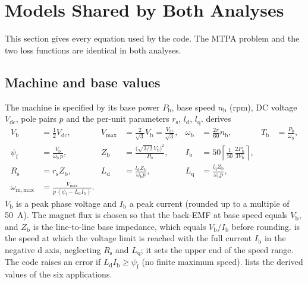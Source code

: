 \section{Models Shared by Both Analyses}\label{sec:models}
This section gives every equation used by the code. The MTPA problem and the two loss functions are identical in both analyses.

\subsection{Machine and base values}\label{sec:design}
The machine is specified by its base power $P_\mathrm{b}$, base speed $n_\mathrm{b}$ (rpm), DC voltage $V_\mathrm{dc}$, pole pairs $p$ and the per-unit parameters $r_\mathrm{s}$, $l_\mathrm{d}$, $l_\mathrm{q}$.  derives
\begin{align}
V_\mathrm{b}&=\tfrac12 V_\mathrm{dc}, & V_\mathrm{max}&=\tfrac{2}{\sqrt3}V_\mathrm{b}=\tfrac{V_\mathrm{dc}}{\sqrt3}, & \omega_\mathrm{b}&=\tfrac{2\pi}{60}n_\mathrm{b}, & T_\mathrm{b}&=\tfrac{P_\mathrm{b}}{\omega_\mathrm{b}}, \label{eq:base1}\\
\psi_\mathrm{f}&=\frac{V_\mathrm{b}}{\omega_\mathrm{b}\,p}, & Z_\mathrm{b}&=\frac{\big(\sqrt{3/2}\,V_\mathrm{b}\big)^2}{P_\mathrm{b}}, & I_\mathrm{b}&=50\left\lceil\frac{1}{50}\,\frac{2P_\mathrm{b}}{3V_\mathrm{b}}\right\rceil, \label{eq:base2}\\
R_\mathrm{s}&=r_\mathrm{s}Z_\mathrm{b}, & L_\mathrm{d}&=\frac{l_\mathrm{d}Z_\mathrm{b}}{\omega_\mathrm{b}p}, & L_\mathrm{q}&=\frac{l_\mathrm{q}Z_\mathrm{b}}{\omega_\mathrm{b}p}, \label{eq:base3}\\
\omega_\mathrm{m,max}&=\frac{V_\mathrm{max}}{p\,(\psi_\mathrm{f}-L_\mathrm{d}I_\mathrm{b})}. \label{eq:wmax}
\end{align}
$V_\mathrm{b}$ is a peak phase voltage and $I_\mathrm{b}$ a peak current (rounded up to a multiple of \SI{50}{\ampere}). The magnet flux is chosen so that the back-EMF at base speed equals $V_\mathrm{b}$, and $Z_\mathrm{b}$ is the line-to-line base impedance, which equals $V_\mathrm{b}/I_\mathrm{b}$ before rounding.  is the speed at which the voltage limit is reached with the full current $I_\mathrm{b}$ in the negative d axis, neglecting $R_\mathrm{s}$ and $L_\mathrm{q}$; it sets the upper end of the speed range. The code raises an error if $L_\mathrm{d}I_\mathrm{b}\ge\psi_\mathrm{f}$ (no finite maximum speed).  lists the derived values of the six applications.

